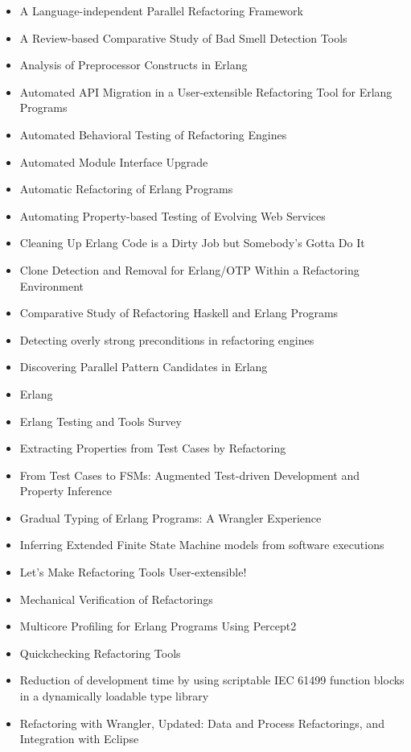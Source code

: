 \begin{itemize}
\item A Language-independent Parallel Refactoring Framework
\item A Review-based Comparative Study of Bad Smell Detection Tools
\item Analysis of Preprocessor Constructs in Erlang
\item Automated API Migration in a User-extensible Refactoring Tool for Erlang Programs
\item Automated Behavioral Testing of Refactoring Engines
\item Automated Module Interface Upgrade
\item Automatic Refactoring of Erlang Programs
\item Automating Property-based Testing of Evolving Web Services
\item Cleaning Up Erlang Code is a Dirty Job but Somebody's Gotta Do It
\item Clone Detection and Removal for Erlang/OTP Within a Refactoring Environment
\item Comparative Study of Refactoring Haskell and Erlang Programs
\item Detecting overly strong preconditions in refactoring engines
\item Discovering Parallel Pattern Candidates in Erlang
\item Erlang
\item Erlang Testing and Tools Survey
\item Extracting Properties from Test Cases by Refactoring
\item From Test Cases to FSMs: Augmented Test-driven Development and Property Inference
\item Gradual Typing of Erlang Programs: A Wrangler Experience
\item Inferring Extended Finite State Machine models from software executions
\item Let's Make Refactoring Tools User-extensible!
\item Mechanical Verification of Refactorings
\item Multicore Profiling for Erlang Programs Using Percept2
\item Quickchecking Refactoring Tools
\item Reduction of development time by using scriptable IEC 61499 function blocks in a dynamically loadable type library
\item Refactoring with Wrangler, Updated: Data and Process Refactorings, and Integration with Eclipse

\end{itemize}
